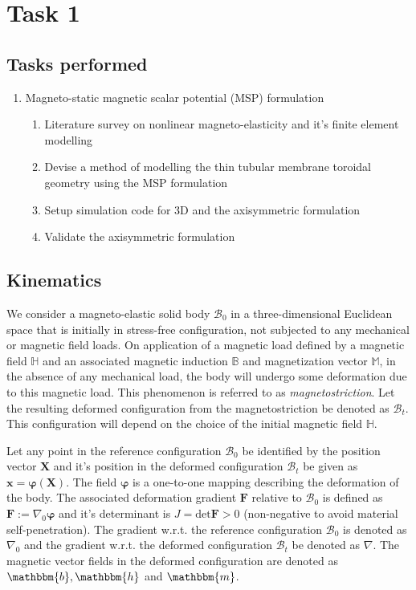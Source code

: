 \chapter{Task 1}
\section{Tasks performed}
\begin{enumerate}
\item Magneto-static magnetic scalar potential (MSP) formulation
\begin{enumerate}
\item Literature survey on nonlinear magneto-elasticity and it's finite element modelling \cite{dorfmann2004, dorfmann2005, reddy_toroid, barham}
\item Devise a method of modelling the thin tubular membrane toroidal geometry using the MSP formulation 
\item Setup simulation code for 3D and the axisymmetric formulation 
\item Validate the axisymmetric formulation 
\end{enumerate}
\end{enumerate}

\section{Kinematics}
We consider a magneto-elastic solid body $\mathcal{B}_0$ in a three-dimensional Euclidean space that is initially in stress-free configuration, not subjected to any mechanical or magnetic field loads. On application of a magnetic load defined by a magnetic field $\mathbb{H}$ and an associated magnetic induction $\mathbb{B}$ and magnetization vector $\mathbb{M}$, in the absence of any mechanical load, the body will undergo some deformation due to this magnetic load. This phenomenon is referred to as \textit{magnetostriction}. Let the resulting deformed configuration from the magnetostriction be denoted as $\mathcal{B}_t$. This configuration will depend on the choice of the initial magnetic field $\mathbb{H}$. \par 
Let any point in the reference configuration $\mathcal{B}_0$ be identified by the position vector $\mathbf{X}$ and it's position in the deformed configuration $\mathcal{B}_t$ be given as $\mathbf{x} = \bm{\varphi} (\mathbf{X})$. The field $\bm{\varphi}$ is a one-to-one mapping describing the deformation of the body. The associated deformation gradient $\mathbf{F}$ relative to $\mathcal{B}_0$ is defined as $\mathbf{F} := \nabla_0 \bm{\varphi}$ and it's determinant is $J = \text{det}\mathbf{F} > 0$ (non-negative to avoid material self-penetration). The gradient w.r.t. the reference configuration $\mathcal{B}_0$ is denoted as $\nabla_0$ and the gradient w.r.t. the deformed configuration $\mathcal{B}_t$ be denoted as $\nabla$. The magnetic vector fields in the deformed configuration are denoted as $\mathbbm{b}, \mathbbm{h}$ and $\mathbbm{m}$.\par 

